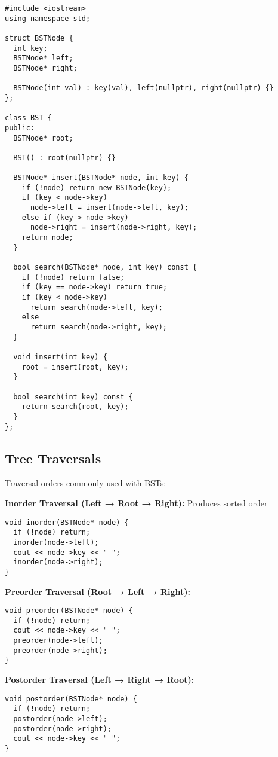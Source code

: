 \documentclass{article}
\begin{document}
\begin{lstlisting}[style=cppstyle]
#include <iostream>
using namespace std;

struct BSTNode {
  int key;
  BSTNode* left;
  BSTNode* right;

  BSTNode(int val) : key(val), left(nullptr), right(nullptr) {}
};

class BST {
public:
  BSTNode* root;

  BST() : root(nullptr) {}

  BSTNode* insert(BSTNode* node, int key) {
    if (!node) return new BSTNode(key);
    if (key < node->key)
      node->left = insert(node->left, key);
    else if (key > node->key)
      node->right = insert(node->right, key);
    return node;
  }

  bool search(BSTNode* node, int key) const {
    if (!node) return false;
    if (key == node->key) return true;
    if (key < node->key)
      return search(node->left, key);
    else
      return search(node->right, key);
  }

  void insert(int key) {
    root = insert(root, key);
  }

  bool search(int key) const {
    return search(root, key);
  }
};
\end{lstlisting}

\subsection{Tree Traversals}
Traversal orders commonly used with BSTs:

\textbf{Inorder Traversal (Left → Root → Right):} Produces sorted order  
\begin{lstlisting}[style=cppstyle]
void inorder(BSTNode* node) {
  if (!node) return;
  inorder(node->left);
  cout << node->key << " ";
  inorder(node->right);
}
\end{lstlisting}

\textbf{Preorder Traversal (Root → Left → Right):}
\begin{lstlisting}[style=cppstyle]
void preorder(BSTNode* node) {
  if (!node) return;
  cout << node->key << " ";
  preorder(node->left);
  preorder(node->right);
}
\end{lstlisting}

\textbf{Postorder Traversal (Left → Right → Root):}
\begin{lstlisting}[style=cppstyle]
void postorder(BSTNode* node) {
  if (!node) return;
  postorder(node->left);
  postorder(node->right);
  cout << node->key << " ";
}
\end{lstlisting}
\end{document}

